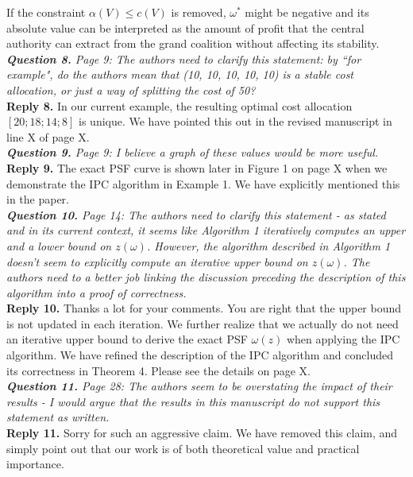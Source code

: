 \documentclass[11pt]{article}
\begin{document}
If the constraint $\alpha(V) \leq c(V)$ is removed, $\omega^*$ might be negative and its absolute value can be interpreted as the amount of profit that the central authority can extract from the grand coalition without affecting its stability.
\\[4mm]
%
%
%
\noindent \textit{\textbf{Question 8.}
Page 9: The authors need to clarify this statement: by ``for example", do the authors mean that (10, 10, 10, 10, 10) is a stable cost allocation, or just a way of splitting the cost of 50?
}
\\[2mm]
\noindent \textbf{Reply 8.}
In our current example, the resulting optimal cost allocation $[20; 18; 14; 8]$ is unique.
We have pointed this out in the revised manuscript in line X of page X.
\\[4mm]
%
%
%
\noindent \textit{\textbf{Question 9.}
Page 9: I believe a graph of these values would be more useful.
}
\\[2mm]
\noindent \textbf{Reply 9.}
The exact PSF curve is shown later in Figure 1 on page X when we demonstrate the IPC algorithm in Example 1. We have explicitly mentioned this in the paper.
\\[4mm]
%
%
%
\noindent \textit{\textbf{Question 10.}
Page 14: The authors need to clarify this statement - as stated and in its current context, it seems like Algorithm 1 iteratively computes an upper and a lower bound on $z(\omega)$. However, the algorithm described in Algorithm 1 doesn't seem to explicitly compute an iterative upper bound on $z(\omega)$. The authors need to a better job linking the discussion preceding the description of this algorithm into a proof of correctness.
}
\\[2mm]
\noindent \textbf{Reply 10.}
Thanks a lot for your comments.
You are right that the upper bound is not updated in each iteration. We further realize that we actually do not need an iterative upper bound to derive the exact PSF $\omega(z)$ when applying the IPC algorithm.
We have refined the description of the IPC algorithm and concluded its correctness in Theorem 4.
Please see the details on page X.
\\[4mm]
%
%
%
\noindent \textit{\textbf{Question 11.}
Page 28: The authors seem to be overstating the impact of their results - I would argue that the results in this manuscript do not support this statement as written.
}
\\[2mm]
\noindent \textbf{Reply 11.}
Sorry for such an aggressive claim. We have removed this claim, and simply point out that our work is of both theoretical value and practical importance.
\\[4mm]

















\end{document}

